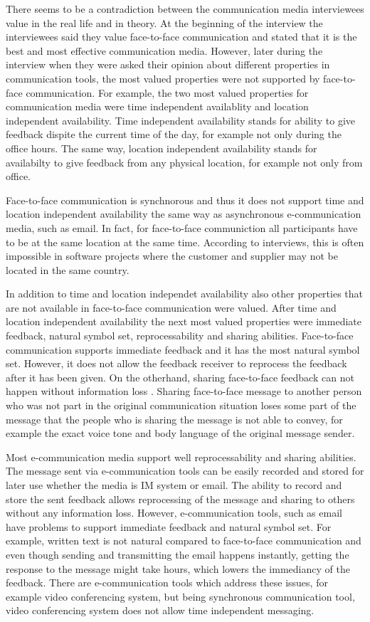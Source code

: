 \documentclass[english,12pt,a4paper,pdftex]{article}
\begin{document}
There seems to be a contradiction between the communication media interviewees value in the real life and in theory. At the beginning of the interview the interviewees said they value face-to-face communication and stated that it is the best and most effective communication media. However, later during the interview when they were asked their opinion about different properties in communication tools, the most valued properties were not supported by face-to-face communication. For example, the two most valued properties for communication media were time independent availablity and location independent availability. Time independent availability stands for ability to give feedback dispite the current time of the day, for example not only during the office hours. The same way, location independent availability stands for availabilty to give feedback from any physical location, for example not only from office.

Face-to-face communication is synchnorous and thus it does not support time and location independent availability the same way as asynchronous e-communication media, such as email. In fact, for face-to-face communiction all participants have to be at the same location at the same time. According to interviews, this is often impossible in software projects where the customer and supplier may not be located in the same country.

In addition to time and location independet availability also other properties that are not available in face-to-face communication were valued. After time and location independent availability the next most valued properties were immediate feedback, natural symbol set, reprocessability and sharing abilities. Face-to-face communication supports immediate feedback and it has the most natural symbol set. However, it does not allow the feedback receiver to reprocess the feedback after it has been given. On the otherhand, sharing face-to-face feedback can not happen without information loss \citep{higa2007}. Sharing face-to-face message to another person who was not part in the original communication situation loses some part of the message that the people who is sharing the message is not able to convey, for example the exact voice tone and body language of the original message sender.

Most e-communication media support well reprocessability and sharing abilities. The message sent via e-communication tools can be easily recorded and stored for later use whether the media is \ac{IM} system or email. The ability to record and store the sent feedback allows reprocessing of the message and sharing to others without any information loss. However, e-communication tools, such as email have problems to support immediate feedback and natural symbol set. For example, written text is not natural compared to face-to-face communication and even though sending and transmitting the email happens instantly, getting the response to the message might take hours, which lowers the immediancy of the feedback. There are e-communication tools which address these issues, for example video conferencing system, but being synchronous communication tool, video conferencing system does not allow time independent messaging.
\end{document}
